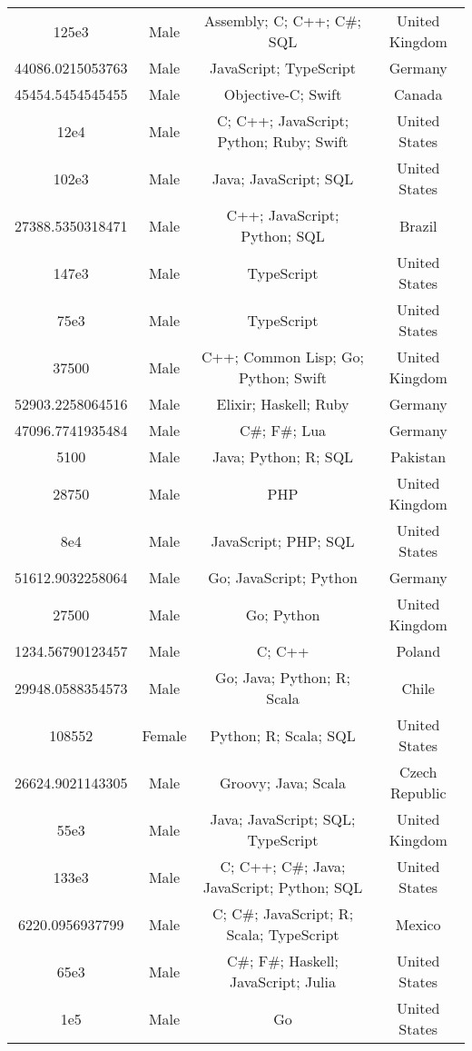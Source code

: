 \begin{center}
\begin{tabular}{ |c|c|c|c| }
125e3  &  Male  &  Assembly; C; C++; C\#; SQL  &  United Kingdom  \\ 
44086.0215053763  &  Male  &  JavaScript; TypeScript  &  Germany  \\ 
45454.5454545455  &  Male  &  Objective-C; Swift  &  Canada  \\ 
12e4  &  Male  &  C; C++; JavaScript; Python; Ruby; Swift  &  United States  \\ 
102e3  &  Male  &  Java; JavaScript; SQL  &  United States  \\ 
27388.5350318471  &  Male  &  C++; JavaScript; Python; SQL  &  Brazil  \\ 
147e3  &  Male  &  TypeScript  &  United States  \\ 
75e3  &  Male  &  TypeScript  &  United States  \\ 
37500  &  Male  &  C++; Common Lisp; Go; Python; Swift  &  United Kingdom  \\ 
52903.2258064516  &  Male  &  Elixir; Haskell; Ruby  &  Germany  \\ 
47096.7741935484  &  Male  &  C\#; F\#; Lua  &  Germany  \\ 
5100  &  Male  &  Java; Python; R; SQL  &  Pakistan  \\ 
28750  &  Male  &  PHP  &  United Kingdom  \\ 
8e4  &  Male  &  JavaScript; PHP; SQL  &  United States  \\ 
51612.9032258064  &  Male  &  Go; JavaScript; Python  &  Germany  \\ 
27500  &  Male  &  Go; Python  &  United Kingdom  \\ 
1234.56790123457  &  Male  &  C; C++  &  Poland  \\ 
29948.0588354573  &  Male  &  Go; Java; Python; R; Scala  &  Chile  \\ 
108552  &  Female  &  Python; R; Scala; SQL  &  United States  \\ 
26624.9021143305  &  Male  &  Groovy; Java; Scala  &  Czech Republic  \\ 
55e3  &  Male  &  Java; JavaScript; SQL; TypeScript  &  United Kingdom  \\ 
133e3  &  Male  &  C; C++; C\#; Java; JavaScript; Python; SQL  &  United States  \\ 
6220.0956937799  &  Male  &  C; C\#; JavaScript; R; Scala; TypeScript  &  Mexico  \\ 
65e3  &  Male  &  C\#; F\#; Haskell; JavaScript; Julia  &  United States  \\ 
1e5  &  Male  &  Go  &  United States  \\ 

\end{tabular}
\end{center}
